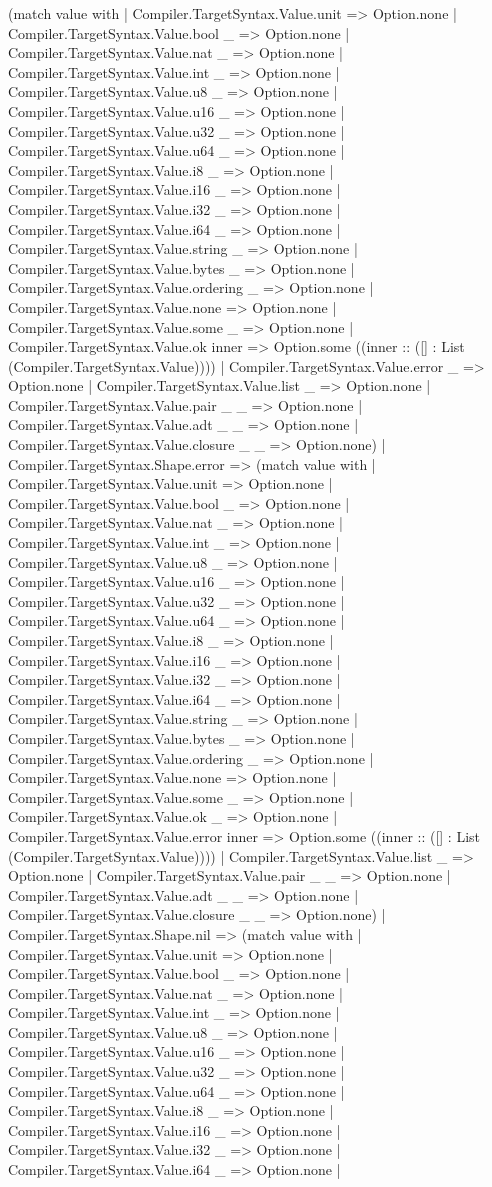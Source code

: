 \documentclass[11pt]{article}
\begin{document}
(match value with | Compiler.TargetSyntax.Value.unit => Option.none | Compiler.TargetSyntax.Value.bool \_ => Option.none | Compiler.TargetSyntax.Value.nat \_ => Option.none | Compiler.TargetSyntax.Value.int \_ => Option.none | Compiler.TargetSyntax.Value.u8 \_ => Option.none | Compiler.TargetSyntax.Value.u16 \_ => Option.none | Compiler.TargetSyntax.Value.u32 \_ => Option.none | Compiler.TargetSyntax.Value.u64 \_ => Option.none | Compiler.TargetSyntax.Value.i8 \_ => Option.none | Compiler.TargetSyntax.Value.i16 \_ => Option.none | Compiler.TargetSyntax.Value.i32 \_ => Option.none | Compiler.TargetSyntax.Value.i64 \_ => Option.none | Compiler.TargetSyntax.Value.string \_ => Option.none | Compiler.TargetSyntax.Value.bytes \_ => Option.none | Compiler.TargetSyntax.Value.ordering \_ => Option.none | Compiler.TargetSyntax.Value.none => Option.none | Compiler.TargetSyntax.Value.some \_ => Option.none | Compiler.TargetSyntax.Value.ok inner => Option.some ((inner :: ([] : List (Compiler.TargetSyntax.Value)))) | Compiler.TargetSyntax.Value.error \_ => Option.none | Compiler.TargetSyntax.Value.list \_ => Option.none | Compiler.TargetSyntax.Value.pair \_ \_ => Option.none | Compiler.TargetSyntax.Value.adt \_ \_ => Option.none | Compiler.TargetSyntax.Value.closure \_ \_ => Option.none) | Compiler.TargetSyntax.Shape.error => (match value with | Compiler.TargetSyntax.Value.unit => Option.none | Compiler.TargetSyntax.Value.bool \_ => Option.none | Compiler.TargetSyntax.Value.nat \_ => Option.none | Compiler.TargetSyntax.Value.int \_ => Option.none | Compiler.TargetSyntax.Value.u8 \_ => Option.none | Compiler.TargetSyntax.Value.u16 \_ => Option.none | Compiler.TargetSyntax.Value.u32 \_ => Option.none | Compiler.TargetSyntax.Value.u64 \_ => Option.none | Compiler.TargetSyntax.Value.i8 \_ => Option.none | Compiler.TargetSyntax.Value.i16 \_ => Option.none | Compiler.TargetSyntax.Value.i32 \_ => Option.none | Compiler.TargetSyntax.Value.i64 \_ => Option.none | Compiler.TargetSyntax.Value.string \_ => Option.none | Compiler.TargetSyntax.Value.bytes \_ => Option.none | Compiler.TargetSyntax.Value.ordering \_ => Option.none | Compiler.TargetSyntax.Value.none => Option.none | Compiler.TargetSyntax.Value.some \_ => Option.none | Compiler.TargetSyntax.Value.ok \_ => Option.none | Compiler.TargetSyntax.Value.error inner => Option.some ((inner :: ([] : List (Compiler.TargetSyntax.Value)))) | Compiler.TargetSyntax.Value.list \_ => Option.none | Compiler.TargetSyntax.Value.pair \_ \_ => Option.none | Compiler.TargetSyntax.Value.adt \_ \_ => Option.none | Compiler.TargetSyntax.Value.closure \_ \_ => Option.none) | Compiler.TargetSyntax.Shape.nil => (match value with | Compiler.TargetSyntax.Value.unit => Option.none | Compiler.TargetSyntax.Value.bool \_ => Option.none | Compiler.TargetSyntax.Value.nat \_ => Option.none | Compiler.TargetSyntax.Value.int \_ => Option.none | Compiler.TargetSyntax.Value.u8 \_ => Option.none | Compiler.TargetSyntax.Value.u16 \_ => Option.none | Compiler.TargetSyntax.Value.u32 \_ => Option.none | Compiler.TargetSyntax.Value.u64 \_ => Option.none | Compiler.TargetSyntax.Value.i8 \_ => Option.none | Compiler.TargetSyntax.Value.i16 \_ => Option.none | Compiler.TargetSyntax.Value.i32 \_ => Option.none | Compiler.TargetSyntax.Value.i64 \_ => Option.none | 
\end{document}
